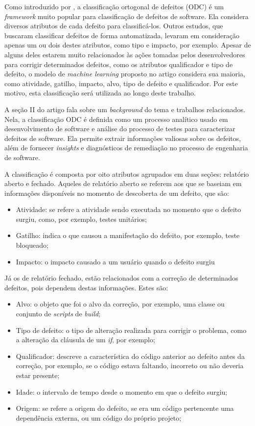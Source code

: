 Como introduzido por \cite{automatic_odc_using_ml}, a classificação ortogonal de defeitos (ODC) é um \textit{framework} muito popular para classificação de defeitos de software. Ela considera diversos atributos de cada defeito para classificá-los. Outros estudos, que buscaram classificar defeitos de forma automatizada, levaram em consideração apenas um ou dois destes atributos, como tipo e impacto, por exemplo. Apesar de alguns deles estarem muito relacionados às ações tomadas pelos desenvolvedores para corrigir determinados defeitos, como os atributos qualificador e tipo de defeito, o modelo de \textit{machine learning} proposto no artigo considera sua maioria, como atividade, gatilho, impacto, alvo, tipo de defeito e qualificador. Por este motivo, esta classificação será utilizada ao longo deste trabalho.

A seção II do artigo fala sobre um \textit{background} do tema e trabalhos relacionados. Nela, a classificação ODC é definida como um processo analítico usado em desenvolvimento de software e análise do processo de testes para caracterizar defeitos de software. Ela permite extrair informações valiosas sobre os defeitos, além de fornecer \textit{insights} e diagnósticos de remediação no processo de engenharia de software.

A classificação é composta por oito atributos agrupados em duas seções: relatório aberto e fechado. Aqueles de relatório aberto se referem aos que se baseiam em informações disponíveis no momento de descoberta de um defeito, que são:

\begin{itemize}
    \item Atividade: se refere a atividade sendo executada no momento que o defeito surgiu, como, por exemplo, testes unitários;
    \item Gatilho: indica o que causou a manifestação do defeito, por exemplo, teste bloqueado;
    \item Impacto: o impacto causado a um usuário quando o defeito surgiu
\end{itemize}

Já os de relatório fechado, estão relacionados com a correção de determinados defeitos, pois dependem destas informações. Estes são:

\begin{itemize}
    \item Alvo: o objeto que foi o alvo da correção, por exemplo, uma classe ou conjunto de \textit{scripts} de \textit{build};
    \item Tipo de defeito: o tipo de alteração realizada para corrigir o problema, como a alteração da cláusula de um \textit{if}, por exemplo;
    \item Qualificador: descreve a característica do código anterior ao defeito antes da correção, por exemplo, se o código estava faltando, incorreto ou não deveria estar presente;
    \item Idade: o intervalo de tempo desde o momento em que o defeito surgiu;
    \item Origem: se refere a origem do defeito, se era um código pertencente uma dependência externa, ou um código do próprio projeto;
\end{itemize}

